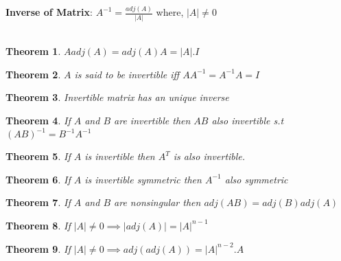 \documentclass[12pt]{article}
\newtheorem{thm}{Theorem}
\begin{document}
\textbf{Inverse of Matrix}: $ A^{-1} = \frac{adj(A)}{|A|}$ where, $|A| \not=0$
\\
\\
\begin{thm}\normalfont
	$Aadj(A) = adj(A)A = |A|.I$
\end{thm}
\begin{thm}\normalfont
	$A$ is said to be invertible iff $AA^{-1} = A^{-1}A = I$
\end{thm}
\begin{thm}\normalfont
	Invertible matrix has an unique inverse
\end{thm}
\begin{thm}\normalfont
	If $A$ and $B$ are invertible then  $AB$ also invertible s.t $(AB)^{-1}= B^{-1}A^{-1}$
\end{thm}
\begin{thm}\normalfont
 If $A$ is invertible then $A^T$ is also invertible.
\end{thm}
\begin{thm}\normalfont
If $A$ is invertible symmetric then $A^{-1} $ also symmetric
\end{thm}
\begin{thm}\normalfont
 If $A$ and $B$ are nonsingular then $adj(AB) = adj(B)adj(A)$
\end{thm}
\begin{thm}\normalfont
 If $|A |\not= 0 \implies |adj(A) |= |A|^{n-1}$
\end{thm}
\begin{thm}\normalfont
	If $|A|\not= 0 \implies adj(adj(A)) = |A|^{n-2}.A$
\end{thm}
\end{document}
